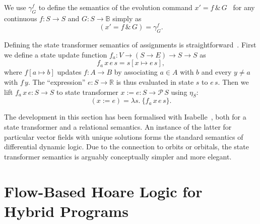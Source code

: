 \documentclass[envcountsame]{llncs}
\newcommand{\Pow}{\mathcal{P}}
\newcommand{\reals}{\mathbb{R}}
\newcommand{\bools}{\mathbb{B}}
\begin{document}
We use $\gamma^f_G$ to define the semantics of the evolution command
$x'= f\, \&\, G$~\cite{MuniveS19} for any continuous $f:S\to S$ and
$G:S\to \bools$ simply as
\begin{equation}
{(x'= f\, \&\, G)} = \gamma^f_G.\label{eq:st-evl}\tag{st-evl}
\end{equation}

Defining the state transformer semantics of assignments is
straightforward~\cite{MuniveS19}. First we define a state update
function $f_a:V\to (S \to E) \to S\to S$ as
\begin{equation*}
f_a\, x\, e\, s = s[x\mapsto e\, s],
\end{equation*}
where $f[a\mapsto b]$ updates $f:A\to B$ by associating $a\in A$ with
$b$ and every $y\neq a$ with $f\, y$.  The ``expression''
${e:S\to \reals}$ is thus evaluated in state $s$ to $e\, s$.  Then we
lift $f_a\, x\, e:S\to S$ to state transformer
$x:= e:S \to \Pow\, S$ using $\eta_S$:
\begin{equation}
  (x:= e) = \lambda s.\ \{f_a\, x\, e\, s\}.\label{eq:st-assgn}\tag{st-assgn}
\end{equation}

The development in this section has been formalised with
Isabelle~\cite{afp:hybrid}, both for a state transformer and a
relational semantics. An instance of the latter for particular vector
fields with unique solutions forms the standard semantics of
differential dynamic logic. Due to the connection to orbits or
orbitals, the state transformer semantics is arguably conceptually
simpler and more elegant.



\section{Flow-Based Hoare Logic for Hybrid
  Programs}\label{sec:hoare-flow}
\end{document}
